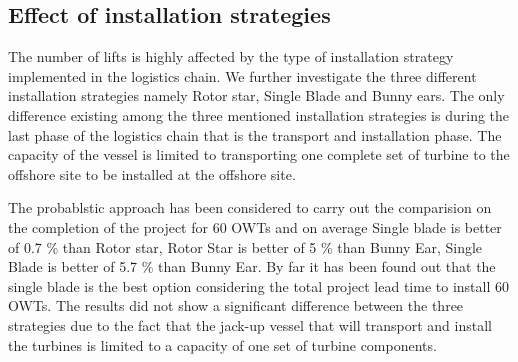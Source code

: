 \subsection{Effect of installation strategies}
The number of lifts is highly affected by the type of installation strategy implemented in the logistics chain. We further investigate the three different installation strategies namely Rotor star, Single Blade and Bunny ears. The only difference existing among the three mentioned installation strategies is during the last phase of the logistics chain that is the transport and installation phase. The capacity of the vessel is limited to transporting one complete set of turbine to the offshore site to be installed at the offshore site.

The probablstic approach has been considered to carry out the comparision on the completion of the project for 60 OWTs and on average Single blade is better of 0.7 \% than Rotor star, Rotor Star is better of 5 \% than Bunny Ear, Single Blade is better of 5.7 \% than Bunny Ear. By far it has been found out that the single blade is the best option considering the total project lead time to install 60 OWTs. The results did not show a significant difference between the three strategies due to the fact that the jack-up vessel that will transport and install the turbines is limited to a capacity of one set of turbine components. 
